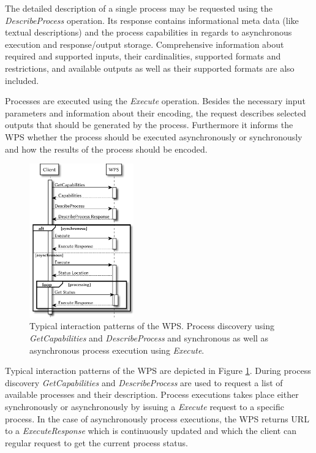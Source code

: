 	The detailed description of a single process may be requested using the \emph{DescribeProcess} operation. Its response contains informational meta data (like textual descriptions) and the process capabilities in regards to asynchronous execution and response/output storage. Comprehensive information about required and supported inputs, their cardinalities, supported formats and restrictions, and available outputs as well as their supported formats are also included.

	Processes are executed using the \emph{Execute} operation. Besides the necessary input parameters and information about their encoding, the request describes selected outputs that should be generated by the process. Furthermore it informs the \ac{WPS} whether the process should be executed asynchronously or synchronously and how the results of the process should be encoded.

	\begin{figure}[!htb]
		\centering
		\includegraphics[width=0.40140845070422537\textwidth]{figures/sequence-diagramm-wps.pdf}
		\caption{\label{fig:sd:wps}Typical interaction patterns of the \acl{WPS}. Process discovery using \emph{GetCapabilities} and \emph{DescribeProcess} and synchronous as well as asynchronous process execution using \emph{Execute}.}
	\end{figure}

	Typical interaction patterns of the \acl{WPS} are depicted in Figure \ref{fig:sd:wps}. During process discovery \emph{GetCapabilities} and \emph{DescribeProcess} are used to request a list of available processes and their description. Process executions takes place either synchronously or asynchronously by issuing a \emph{Execute} request to a specific process. In the case of asynchronously process executions, the \ac{WPS} returns URL to a \emph{ExecuteResponse} which is continuously updated and which the client can regular request to get the current process status.


